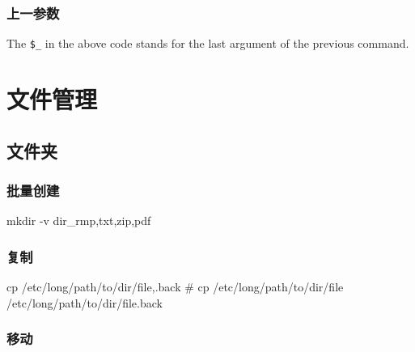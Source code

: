 \documentclass[hidelinks]{ctexart}
\begin{document}

\subsubsection{上一参数} %
\label{ssub:上一参数}

The \texttt{\$\_} in the above code stands for the last argument of the previous command.




\section{文件管理} %
\label{sec:文件管理}

\subsection{文件夹} %
\label{sub:文件夹}

\subsubsection{批量创建} %
\label{ssub:批量创建}

\begin{shlst}
mkdir -v dir_{rmp,txt,zip,pdf}
\end{shlst}


\subsubsection{复制} %
\label{ssub:复制}

\begin{shlst}
cp /etc/long/path/to/dir/file{,.back}
# cp /etc/long/path/to/dir/file /etc/long/path/to/dir/file.back
\end{shlst}


\subsubsection{移动} %
\label{ssub:移动}
\end{document}
